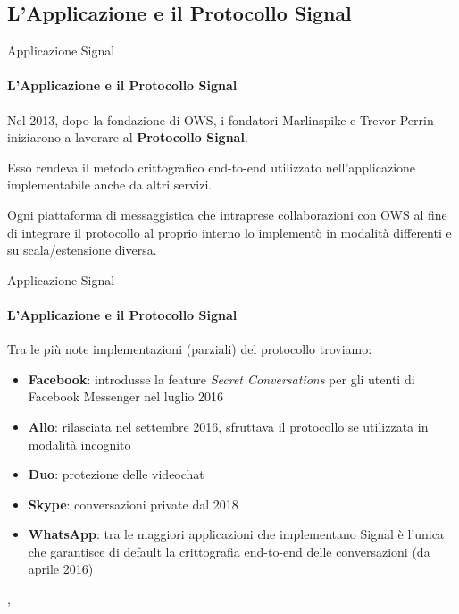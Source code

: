 \subsection{L'Applicazione e il Protocollo Signal}

\begin{frame}{Applicazione Signal}
    \framesubtitle{L'Applicazione e il Protocollo Signal}
    
    Nel 2013, dopo la fondazione di OWS, i fondatori Marlinspike e Trevor Perrin iniziarono a lavorare al \textbf{Protocollo Signal}.\newline\pause
    
    Esso rendeva il metodo crittografico end-to-end utilizzato nell’applicazione implementabile anche da altri servizi.\newline\pause
    
    Ogni piattaforma di messaggistica che intraprese collaborazioni con OWS al fine di integrare il protocollo al proprio interno lo implementò in modalità differenti e su scala/estensione diversa.

\end{frame}

\begin{frame}{Applicazione Signal}
    \framesubtitle{L'Applicazione e il Protocollo Signal}
    Tra le più note implementazioni (parziali) del protocollo troviamo:\pause
    \begin{itemize}
        \item <1-> \textbf{Facebook}: introdusse la feature \textit{Secret Conversations} per gli utenti di Facebook Messenger nel luglio 2016\pause
        \item <2-> \textbf{Allo}: rilasciata nel settembre 2016, sfruttava il protocollo se utilizzata in modalità incognito\pause
        \item <3-> \textbf{Duo}: protezione delle videochat\pause
        \item <4-> \textbf{Skype}: conversazioni private dal 2018\pause
        \item <5-> \textbf{WhatsApp}: tra le maggiori applicazioni che implementano Signal è l’unica che garantisce di default la crittografia end-to-end delle conversazioni (da aprile 2016)
    \end{itemize}
    
    \cite{greenberg}, \cite{Lumb}
    
\end{frame}

